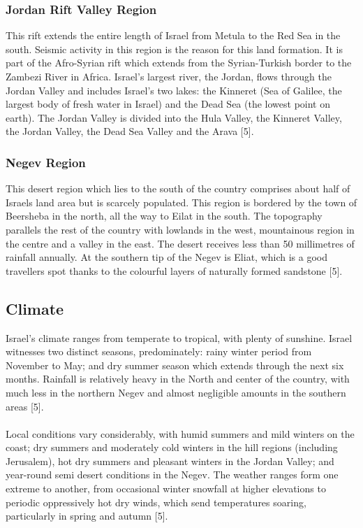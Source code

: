 \documentclass[10pt]{article}
\begin{document}
\subsubsection{Jordan Rift Valley Region}
This rift extends the entire length of Israel from  Metula to the Red Sea in the south. Seismic activity in this region is the reason for this land formation. It is part of the Afro-Syrian rift which extends from the Syrian-Turkish border to the Zambezi River in Africa. Israel's largest river, the Jordan, flows
through the Jordan Valley and includes Israel's two lakes: the Kinneret (Sea of Galilee, the largest
body of fresh water in Israel) and the Dead Sea (the lowest point on earth).
The Jordan Valley is divided into the Hula Valley, the Kinneret Valley, the Jordan Valley, the Dead Sea Valley and the Arava [5].

\subsubsection{Negev Region}
This desert region which lies to the south of the country comprises about half of Israels land area but is scarcely populated. This region is bordered by the town of Beersheba in the north, all the way to Eilat in the south. The topography parallels the rest of the country with lowlands in the west, mountainous region in the centre and a valley in the east. The desert receives less than 50 millimetres of rainfall annually. At the southern tip of the Negev is Eliat, which is a good travellers spot thanks to the colourful layers of naturally formed sandstone [5].

\subsection{Climate}
Israel's climate ranges from temperate to tropical, with plenty of sunshine. Israel witnesses two distinct seasons, predominately: rainy winter period from November to May; and dry summer season which extends through the next six months. Rainfall is relatively heavy in the North and center of the country, with much less in the northern Negev and almost negligible amounts in the southern areas [5].
\\
\\
Local conditions vary considerably, with humid summers and mild winters on the coast; dry summers and moderately cold winters in the hill regions (including Jerusalem), hot dry summers and pleasant winters in the Jordan Valley; and year-round semi desert conditions in the Negev. The weather ranges form one extreme to another, from occasional winter snowfall at higher elevations to periodic oppressively hot dry winds, which send temperatures soaring, particularly in spring and autumn [5].
\end{document}
